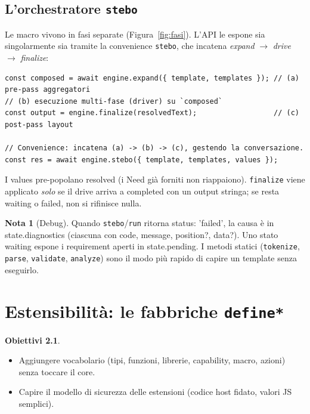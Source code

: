 \documentclass[11pt,a4paper]{book}
\let\code\lstinline
\newcommand{\ic}[1]{{\ttfamily #1}}
\theoremstyle{definition}
\newtheorem*{obiettivi}{Obiettivi}
\newtheorem*{nota}{Nota}
\begin{document}
{{{{\section{L'orchestratore \texttt{stebo}}

Le macro vivono in fasi separate (Figura~\ref{fig:fasi}). L'API le espone sia
singolarmente sia tramite la convenience \code|stebo|, che incatena
\emph{expand} $\rightarrow$ \emph{drive} $\rightarrow$ \emph{finalize}:

\begin{lstlisting}
const composed = await engine.expand({ template, templates }); // (a) pre-pass aggregatori
// (b) esecuzione multi-fase (driver) su `composed`
const output = engine.finalize(resolvedText);                  // (c) post-pass layout

// Convenience: incatena (a) -> (b) -> (c), gestendo la conversazione.
const res = await engine.stebo({ template, templates, values });
\end{lstlisting}

I \ic{values} pre-popolano \ic{resolved} (i Need già forniti non riappaiono).
\code|finalize| viene applicato \emph{solo} se il drive arriva a \ic{completed} con
un \ic{output} stringa; se resta \ic{waiting} o \ic{failed}, non si rifinisce nulla.

\begin{nota}[Debug]
Quando \code|stebo|/\code|run| ritorna \ic{status: 'failed'}, la causa è in
\ic{state.diagnostics} (ciascuna con \ic{code}, \ic{message}, \ic{position?},
\ic{data?}). Uno stato \ic{waiting} espone i requirement aperti in \ic{state.pending}.
I metodi statici (\code|tokenize|, \code|parse|, \code|validate|, \code|analyze|)
sono il modo più rapido di capire un template senza eseguirlo.
\end{nota}

\chapter{Estensibilità: le fabbriche \texttt{define*}}
\label{ch:estensibilita}

\begin{obiettivi}
\begin{itemize}
  \item Aggiungere vocabolario (tipi, funzioni, librerie, capability, macro,
    azioni) senza toccare il core.
  \item Capire il modello di sicurezza delle estensioni (codice host fidato, valori
    JS semplici).
\end{itemize}
\end{obiettivi}

}}}}
\end{document}
